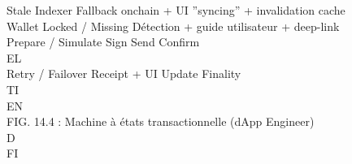 \documentclass[12pt,landscape,a4paper]{article}
\begin{document}
Stale Indexer           Fallback onchain + UI ”syncing” + invalidation cache\\
Wallet Locked / Missing Détection + guide utilisateur + deep-link\\
\vspace{0.5em}
\vspace{0.5em}
\vspace{0.5em}
Prepare / Simulate         Sign          Send        Confirm\\
\vspace{0.5em}
\vspace{0.5em}
\vspace{0.5em}
\vspace{0.5em}
EL\\
Retry / Failover        Receipt + UI Update           Finality\\
\vspace{0.5em}
\vspace{0.5em}
\vspace{0.5em}
\vspace{0.5em}
TI\\
EN\\
FIG. 14.4 : Machine à états transactionnelle (dApp Engineer)\\
\vspace{0.5em}
\vspace{0.5em}
\vspace{0.5em}
\vspace{0.5em}
D\\
FI\\
\end{document}
